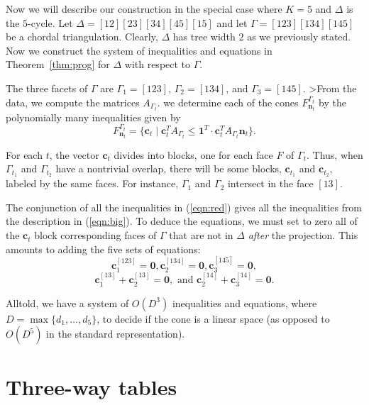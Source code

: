 \documentclass{elsart}
\newcommand{\nn}{\mathbf{n}}
\begin{document}
\begin{exmp}[$5$-cycle]\label{ex:cycle}
Now we will describe our construction in the special case where $K=5$ and 
$\Delta$ is the $5$-cycle.   Let $\Delta =
[12][23][34][45][15]$ and let $\Gamma = [123][134][145]$ be a chordal
triangulation.  Clearly, $\Delta$ has tree width $2$ as we previously
stated.  Now we construct the system of inequalities and
equations  in Theorem~\ref{thm:prog} for $\Delta$
with respect to $\Gamma$.

The three facets of $\Gamma$ are $\Gamma_1 = [123]$,
$\Gamma_2 = [134]$, and $\Gamma_3 = [145]$.  
>From the data, we compute the matrices
$A_{\Gamma_t}$.  we determine each of the cones
$F^{\Gamma_t}_{\nn_t}$ by the polynomially many
inequalities given by
\begin{equation} \label{eqn:red}F^{\Gamma_t}_{\nn_t} = \{\mathbf{c}_t \mid \mathbf{c}_t^T
A_{\Gamma_t} \leq \mathbf{1}^T \cdot  \mathbf{c}_t^T
A_{\Gamma_t} \nn_t \}.
\end{equation}

For each $t$, the vector $\mathbf{c}_t$ divides into
blocks, one for each face $F$ of $\Gamma_t$.  Thus, when $\Gamma_{t_1}$
and $\Gamma_{t_2}$ have a nontrivial overlap, there will be some blocks, 
$\mathbf{c}_{t_1}$ and $\mathbf{c}_{t_2}$, labeled by
the same faces.  For instance, $\Gamma_1$ and $\Gamma_2$ intersect in
the face $[13]$.

The conjunction of all the inequalities in (\ref{eqn:red}) gives all
the inequalities from the description in (\ref{eqn:big}).  To deduce the
equations, we must set to zero all of the $\mathbf{c}_t$ block
corresponding faces of $\Gamma$ that are not in $\Delta$ \emph{after}
the projection.  This amounts to adding the five sets of equations:
\[
\mathbf{c}^{[123]}_{1} = \mathbf{0}, \mathbf{c}^{[134]}_2 =
\mathbf{0}, \mathbf{c}^{[145]}_3 = \mathbf{0},
\]
\[\mathbf{c}^{[13]}_1 + \mathbf{c}^{[13]}_2 = \mathbf{0}, \mbox{ and }
\mathbf{c}^{[14]}_2 + \mathbf{c}^{[14]}_3 = \mathbf{0}.
\]

Alltold, we have a system of $O(D^3)$ inequalities
and equations, where $D = \max \{ d_1, \ldots, d_5 \}$, 
to decide if the cone is a linear space (as opposed to
$O(D^5)$ in the standard representation).

\end{exmp}

\section{Three-way tables}\label{sec:three}
\end{document}
